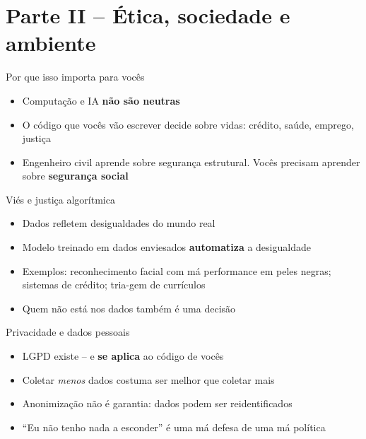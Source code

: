 \documentclass[aspectratio=169]{beamer}
\newcommand{\impt}[1]{\textcolor{maccent}{\textbf{#1}}}
\newcommand{\ntc}[1]{\textcolor{mprimary}{#1}}
\begin{document}
\section{Parte II -- \'Etica, sociedade e ambiente}

\begin{frame}{Por que isso importa para voc\^es}
\begin{itemize}
  \item Computa\c{c}\~ao e IA \impt{n\~ao s\~ao neutras}
  \pause
  \item O c\'odigo que voc\^es v\~ao escrever \ntc{decide} sobre vidas: cr\'edito, sa\'ude, emprego, justi\c{c}a
  \pause
  \item Engenheiro civil aprende sobre seguran\c{c}a estrutural. Voc\^es precisam aprender sobre \impt{seguran\c{c}a social}
\end{itemize}
\end{frame}

\begin{frame}{Vi\'es e justi\c{c}a algor\'itmica}
\begin{itemize}
  \item Dados refletem desigualdades do mundo real
  \pause
  \item Modelo treinado em dados enviesados \impt{automatiza} a desigualdade
  \pause
  \item Exemplos: reconhecimento facial com m\'a performance em peles negras; sistemas de cr\'edito; tria-gem de curr\'iculos
  \pause
  \item \ntc{Quem n\~ao est\'a nos dados} tamb\'em \'e uma decis\~ao
\end{itemize}
\end{frame}

\begin{frame}{Privacidade e dados pessoais}
\begin{itemize}
  \item LGPD existe -- e \impt{se aplica} ao c\'odigo de voc\^es
  \pause
  \item Coletar \emph{menos} dados costuma ser melhor que coletar mais
  \pause
  \item Anonimiza\c{c}\~ao \ntc{n\~ao} \'e garantia: dados podem ser reidentificados
  \pause
  \item ``Eu n\~ao tenho nada a esconder'' \'e uma m\'a defesa de uma m\'a pol\'itica
\end{itemize}
\end{frame}
\end{document}
